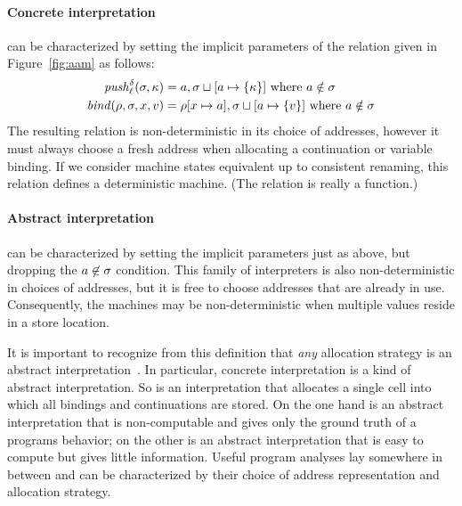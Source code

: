 \documentclass[preprint,onecolumn,9pt]{sigplanconf} %
\begin{document}
\paragraph{Concrete interpretation} can be characterized by setting the implicit
parameters of the relation given in Figure~\ref{fig:aam} as follows:
\begin{align*}
\mathit{push}_{\ell}^{\delta}(\sigma,\kappa) &= a,\sigma\sqcup[a\mapsto\{\kappa\}]
\mbox{ where }a \notin\sigma
\\
\mathit{bind}(\rho,\sigma,x,v) &= \rho[x\mapsto a],\sigma\sqcup[a\mapsto\{v\}]
\mbox{ where }a \notin\sigma
\end{align*}
The resulting relation is non-deterministic in its choice of
addresses, however it must always choose a fresh address when
allocating a continuation or variable binding.  If we consider machine
states equivalent up to consistent renaming, this relation defines
a deterministic machine.  (The relation is really a function.)


\paragraph{Abstract interpretation} can be characterized by setting the implicit
parameters just as above, but dropping the $a \not\in \sigma$
condition.  This family of interpreters is also non-deterministic in
choices of addresses, but it is free to choose addresses that are
already in use.  Consequently, the machines may be non-deterministic
when multiple values reside in a store location.

It is important to recognize from this definition that \emph{any}
allocation strategy is an abstract
interpretation~\cite{MIGHTANDMANOLIOS}.  In particular, concrete
interpretation is a kind of abstract interpretation.  So is an
interpretation that allocates a single cell into which all bindings
and continuations are stored.  On the one hand is an abstract
interpretation that is non-computable and gives only the ground truth
of a programs behavior; on the other is an abstract interpretation
that is easy to compute but gives little information.  Useful program
analyses lay somewhere in between and can be characterized by their
choice of address representation and allocation strategy.

\end{document}

